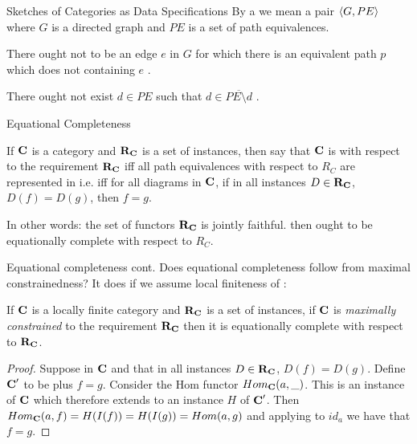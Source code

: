 \newcommand{\goodnessoneA}{
\goodnesscriteria{1A} There ought not to be an edge $e$ in $G$ for which there is an equivalent path $p$ which  does not containing $e$
}
\newcommand{\goodnessoneB}{
\goodnesscriteria{1B} 
There ought not exist $d \in PE$ such that $d \in \overline{PE \setminus d}$
}

\begin{frame}{Sketches of Categories as Data Specifications}
By a  we mean a pair $\langle G,PE\rangle$ where 
$G$ is a directed graph and $PE$ is a set of path equivalences. \\
\medskip
\goodnessoneA. \\
\medskip
\goodnessoneB.
\end{frame}

\begin{frame}{Equational Completeness}
\begin{definition}
If $\textbf{C}$ is a  category and $\textbf{R}_{\textbf{C}}$ is a set of instances,
 then say that  $\textbf{C}$ is  with respect 
to the requirement $\textbf{R}_{\textbf{C}}$ iff all path equivalences with respect to $R_C$ are represented in \catcw 
i.e. iff for all diagrams \fgparalleldiagram in $\textbf{C}$,  
if in all instances $D \in \textbf{R}_{\textbf{C}}$, $D(f)=D(g)$,  then $f=g$.
\end{definition}

In other words:
the set of functors $\textbf{R}_{\textbf{C}}$ is jointly faithful.
\medskip
{} \IfSforCwithRCwords then \catcw ought to be equationally complete
with respect to $R_C$.
\end{frame}

\begin{frame}{Equational completeness cont. }
Does equational completeness follow from maximal constrainedness?
It does if we assume local finiteness of \catc:
\begin{lemma}
If $\textbf{C}$ is a locally finite category and $\textbf{R}_{\textbf{C}}$ is a set of instances, if $\textbf{C}$ 
 is
\textit{maximally constrained} to the requirement $\textbf{R}_{\textbf{C}}$ then it is equationally
complete with respect to $\textbf{R}_{\textbf{C}}$.
\end{lemma}
\begin{proof}
Suppose \fgparalleldiagram  in $\textbf{C}$ and that in all instances $D \in \textbf{R}_{\textbf{C}}$, $D(f)=D(g)$. 
Define $\textbf{C}'$ to be \catc plus $f=g$. Consider the Hom functor $Hom_{\textbf{C}}(a,\_)$. 
This is an instance of $\textbf{C}$ which therefore extends to an instance $H$ of $\textbf{C}'$.  Then
$Hom_{\textbf{C}}(a,f)=H(I(f))=H(I(g))=Hom(a,g)$ and applying to $id_a$ we have that $f=g$.
\end{proof}
\end{frame}

